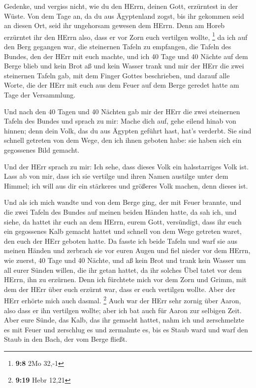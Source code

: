  Gedenke, und vergiss nicht, wie du den HErrn, deinen
Gott, erzürntest in der Wüste. Von dem Tage an, da du aus Ägyptenland
zogst, bis ihr gekommen seid an diesen Ort, seid ihr ungehorsam gewesen
dem HErrn.  Denn am Horeb erzürntet ihr den HErrn also,
dass er vor Zorn euch vertilgen wollte, \footnote{\textbf{9:8} 2Mo 32,-1}
 da ich auf den Berg gegangen war, die steinernen Tafeln
zu empfangen, die Tafeln des Bundes, den der HErr mit euch machte, und
ich 40 Tage und 40 Nächte auf dem Berge blieb und kein Brot aß und kein
Wasser trank  und mir der HErr die zwei steinernen Tafeln
gab, mit dem Finger Gottes beschrieben, und darauf alle Worte, die der
HErr mit euch aus dem Feuer auf dem Berge geredet hatte am Tage der
Versammlung.

 Und nach den 40 Tagen und 40 Nächten gab mir der HErr
die zwei steinernen Tafeln des Bundes  und sprach zu mir:
Mache dich auf, gehe eilend hinab von hinnen; denn dein Volk, das du aus
Ägypten geführt hast, hat's verderbt. Sie sind schnell getreten von dem
Wege, den ich ihnen geboten habe: sie haben sich ein gegossenes Bild
gemacht.

 Und der HErr sprach zu mir: Ich sehe, dass dieses Volk
ein halsstarriges Volk ist.  Lass ab von mir, dass ich
sie vertilge und ihren Namen austilge unter dem Himmel; ich will aus dir
ein stärkeres und größeres Volk machen, denn dieses ist.

 Und als ich mich wandte und von dem Berge ging, der mit
Feuer brannte, und die zwei Tafeln des Bundes auf meinen beiden Händen
hatte,  da sah ich, und siehe, da hattet ihr euch an dem
HErrn, eurem Gott, versündigt, dass ihr euch ein gegossenes Kalb gemacht
hattet und schnell von dem Wege getreten waret, den euch der HErr
geboten hatte.  Da fasste ich beide Tafeln und warf sie
aus meinen Händen und zerbrach sie vor euren Augen  und
fiel nieder vor dem HErrn, wie zuerst, 40 Tage und 40 Nächte, und aß
kein Brot und trank kein Wasser um all eurer Sünden willen, die ihr
getan hattet, da ihr solches Übel tatet vor dem HErrn, ihn zu erzürnen.
 Denn ich fürchtete mich vor dem Zorn und Grimm, mit dem
der HErr über euch erzürnt war, dass er euch vertilgen wollte. Aber der
HErr erhörte mich auch dasmal. \footnote{\textbf{9:19} Hebr 12,21}
 Auch war der HErr sehr zornig über Aaron, also dass er
ihn vertilgen wollte; aber ich bat auch für Aaron zur selbigen Zeit.
 Aber eure Sünde, das Kalb, das ihr gemacht hattet, nahm
ich und zerschmelzte es mit Feuer und zerschlug es und zermalmte es, bis
es Staub ward und warf den Staub in den Bach, der vom Berge fließt.

